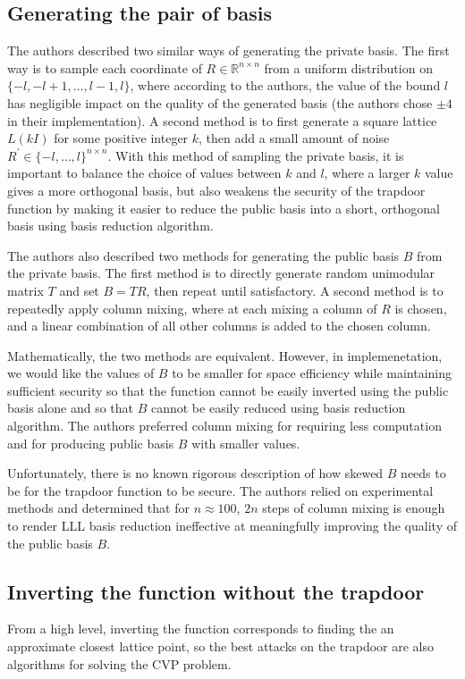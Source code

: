 \documentclass[letterpaper,12pt]{article}
\begin{document}
\subsection{Generating the pair of basis}
The authors described two similar ways of generating the private basis. The first way is to sample each coordinate of $R \in \mathbb{R}^{n \times n}$ from a uniform distribution on $\{-l, -l + 1, \ldots, l-1, l\}$, where according to the authors, the value of the bound $l$ has negligible impact on the quality of the generated basis (the authors chose $\pm 4$ in their implementation). A second method is to first generate a square lattice $L(kI)$ for some positive integer $k$, then add a small amount of noise $R^\prime \in \{-l, \ldots, l\}^{n \times n}$. With this method of sampling the private basis, it is important to balance the choice of values between $k$ and $l$, where a larger $k$ value gives a more orthogonal basis, but also weakens the security of the trapdoor function by making it easier to reduce the public basis into a short, orthogonal basis using basis reduction algorithm.

The authors also described two methods for generating the public basis $B$ from the private basis. The first method is to directly generate random unimodular matrix $T$ and set $B = TR$, then repeat until satisfactory. A second method is to repeatedly apply column mixing, where at each mixing a column of $R$ is chosen, and a linear combination of all other columns is added to the chosen column.

Mathematically, the two methods are equivalent. However, in implemenetation, we would like the values of $B$ to be smaller for space efficiency while maintaining sufficient security so that the function cannot be easily inverted using the public basis alone and so that $B$ cannot be easily reduced using basis reduction algorithm. The authors preferred column mixing for requiring less computation and for producing public basis $B$ with smaller values.

Unfortunately, there is no known rigorous description of how skewed $B$ needs to be for the trapdoor function to be secure. The authors relied on experimental methods and determined that for $n \approx 100$, $2n$ steps of column mixing is enough to render LLL basis reduction ineffective at meaningfully improving the quality of the public basis $B$.

\subsection{Inverting the function without the trapdoor}
From a high level, inverting the function corresponds to finding the an approximate closest lattice point, so the best attacks on the trapdoor are also algorithms for solving the CVP problem.
\end{document}
